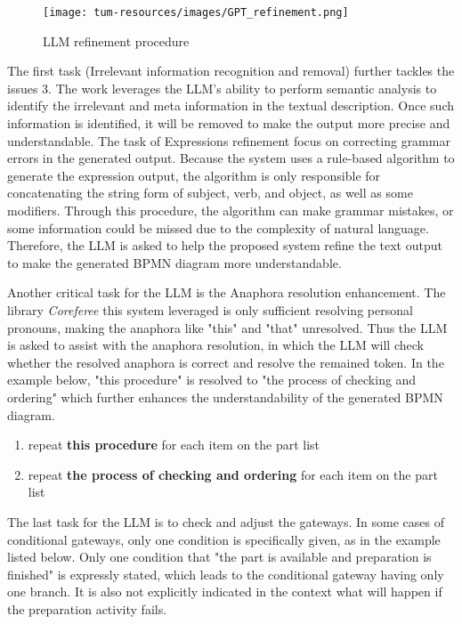 \begin{figure}[h]
    \centering
    \caption{LLM refinement procedure}
    \texttt{[image: tum-resources/images/GPT\_refinement.png]}
\end{figure}

The first task (Irrelevant information recognition and removal) further tackles the issues 3. The work leverages the LLM's ability to perform semantic analysis to identify the irrelevant and meta information in the textual description. Once such information is identified, it will be removed to make the output more precise and understandable. The task of Expressions refinement focus on correcting grammar errors in the generated output. Because the system uses a rule-based algorithm to generate the expression output, the algorithm is only responsible for concatenating the string form of subject, verb, and object, as well as some modifiers. Through this procedure, the algorithm can make grammar mistakes, or some information could be missed due to the complexity of natural language. Therefore, the LLM is asked to help the proposed system refine the text output to make the generated BPMN diagram more understandable.  

Another critical task for the LLM is the Anaphora resolution enhancement. The library \textit{Coreferee} this system leveraged is only sufficient resolving personal pronouns, making the anaphora like "this" and "that" unresolved. Thus the LLM is asked to assist with the anaphora resolution, in which the LLM will check whether the resolved anaphora is correct and resolve the remained token. In the example below, "this procedure" is resolved to "the process of checking and ordering" which further enhances the understandability of the generated BPMN diagram.

\begin{enumerate}
    \item repeat \textbf{this procedure} for each item on the part list
    \item repeat \textbf{the process of checking and ordering} for each item on the part list
\end{enumerate}

The last task for the LLM is to check and adjust the gateways. In some cases of conditional gateways, only one condition is specifically given, as in the example listed below. Only one condition that "the part is available and preparation is finished" is expressly stated, which leads to the conditional gateway having only one branch. It is also not explicitly indicated in the context what will happen if the preparation activity fails.

